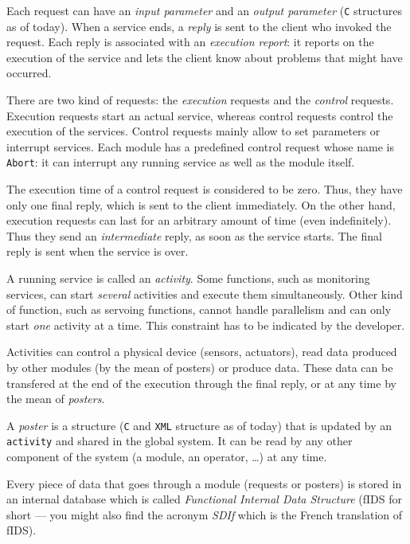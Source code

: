 Each request can  have an \emph{input parameter} and an  
\emph{output parameter} (\texttt{C} structures as  of today). When a service ends,
a   \emph{reply} is sent to   the   client who invoked  the 
request. Each reply  is  associated with an  \emph{execution  report}:  it
reports on the execution of  the service and  lets  the client  know about
problems that might have occurred.

There are two kind of requests: the \emph{execution} requests and the 
\emph{control} requests. Execution requests  start  an actual service,  whereas
control requests control the  execution of the services. Control requests
mainly allow to set parameters or  interrupt services. Each module has  a
predefined control request whose name  is  \texttt{Abort}: it can  interrupt
any running service as well as the module itself.

The execution time of  a control request  is considered to be zero. Thus,
they have only one final reply, which is  sent to the client immediately.
On the other hand, execution requests can last for an arbitrary amount of
time (even indefinitely). Thus they send an \emph{intermediate} reply,  as
soon as the service 
starts.  The final reply is sent when the service is over.

A running  service is called an   \emph{activity}. Some functions,  such as
monitoring services,  can start \emph{several}  activities and  execute them
simultaneously. Other  kind   of function,  such as   servoing functions,
cannot handle  parallelism  and can only  start  \emph{one} activity at  a
time. This constraint has to be indicated by the developer.

Activities can control a physical device (sensors, actuators), read  data
produced by  other modules (by  the mean of  posters) or produce
data. These data can  be transfered at the end  of the  execution through
the final reply, or at any time by the mean of \emph{posters}.

A \emph{poster} is a structure (\texttt{C} and \texttt{XML} structure as  of  
today) that is
updated by an \texttt{activity} and shared in the global system. It can be read by
any other component of the system (a module, an operator, \ldots) at any time.

Every piece  of data that goes through  a module (requests or posters) is
stored  in an internal database  which is called \emph{Functional Internal
Data Structure} (fIDS  for short --- you might  also find the acronym
\emph{SDIf} which is the French translation of fIDS).

